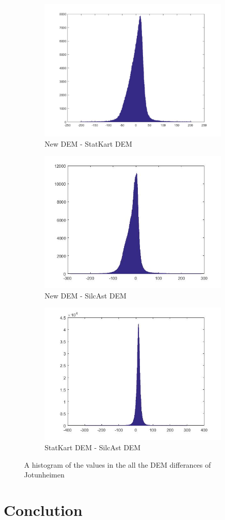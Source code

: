 \documentclass[a4paper,UKenglish]{article}
\begin{document}
\begin{figure}
	\begin{subfigure}{.5\textwidth}
		  \centering
		  \includegraphics[width=.8\linewidth]{hist_SJD}
		  \caption{New DEM - StatKart DEM}
		  \label{fig:sfig1}
	\end{subfigure}%
	\begin{subfigure}{.5\textwidth}
		  \centering
		  \includegraphics[width=.8\linewidth]{hist_SiJD}
		  \caption{New DEM - SilcAst DEM}
		  \label{fig:sfig2}
	\end{subfigure}
	\begin{subfigure}{.5\textwidth}
	  \centering
	  \includegraphics[width=.8\linewidth]{hist_SSiD}
	  \caption{StatKart DEM - SilcAst DEM}
	  \label{fig:sfig3}
	\end{subfigure}
		\caption{A histogram of the values in the all the DEM differances of Jotunheimen}
		\label{fig:fig}
\end{figure}


\section{Conclution}
\end{document}
